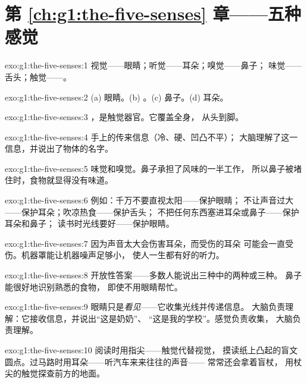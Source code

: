 \section*{第 \ref{ch:g1:the-five-senses} 章——五种感觉}

\begin{solution}{exo:g1:the-five-senses:1}
视觉——眼睛；听觉——耳朵；嗅觉——鼻子；
味觉——舌头；触觉——。
\end{solution}

\begin{solution}{exo:g1:the-five-senses:2}
(a) 眼睛。(b) 。(c) 鼻子。(d) 耳朵。
\end{solution}

\begin{solution}{exo:g1:the-five-senses:3}
，是触觉器官。它覆盖全身，
从头到脚。
\end{solution}

\begin{solution}{exo:g1:the-five-senses:4}
手上的传来信息（冷、硬、凹凸不平）；
大脑理解了这一信息，并说出了物体的名字。
\end{solution}

\begin{solution}{exo:g1:the-five-senses:5}
味觉和嗅觉。鼻子承担了风味的一半工作，
所以鼻子被堵住时，食物就显得没有味道。
\end{solution}

\begin{solution}{exo:g1:the-five-senses:6}
例如：千万不要直视太阳——保护眼睛；
不让声音过大——保护耳朵；吹凉热食——保护舌头；
不把任何东西塞进耳朵或鼻子——保护耳朵和鼻子；
读书时光线要好——保护眼睛。
\end{solution}

\begin{solution}{exo:g1:the-five-senses:7}
因为声音太大会伤害耳朵，而受伤的耳朵
可能会一直受伤。机器罩能让机器噪声足够小，
使人一生都有好的听力。
\end{solution}

\begin{solution}{exo:g1:the-five-senses:8}
开放性答案——多数人能说出三种中的两种或三种。
鼻子能很好地识别熟悉的食物，
即使不用眼睛帮忙。
\end{solution}

\begin{solution}{exo:g1:the-five-senses:9}
眼睛只是\emph{看见}——它收集光线并传递信息。
大脑负责理解：它接收信息，并说出“这是奶奶”、
“这是我的学校”。感觉负责收集，
大脑负责理解。
\end{solution}

\begin{solution}{exo:g1:the-five-senses:10}
阅读时用指尖——触觉代替视觉，
摸读纸上凸起的盲文圆点。过马路时用耳朵——听汽车来来往往的声音——
常常还会拿着盲杖，
用杖尖的触觉探查前方的地面。
\end{solution}
